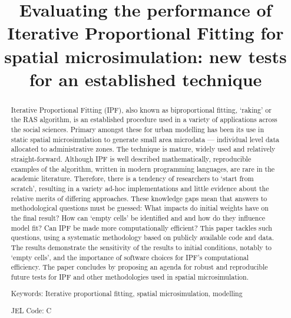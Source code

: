 \documentclass[a4paper,10pt]{article}
\title{Evaluating the performance of Iterative Proportional Fitting for spatial microsimulation: new tests for an established technique}
\begin{document}
\maketitle

\begin{abstract}
Iterative Proportional Fitting (IPF), also known as biproportional
fitting, `raking' or the RAS algorithm,
is an established procedure used in a variety of applications
across the social sciences. Primary amongst these for urban modelling has been its use in
static spatial microsimulation to generate small area microdata --- individual
level data allocated to administrative zones.
The technique is mature, widely used and relatively straight-forward.
Although IPF is well described mathematically, reproducible examples of the
algorithm, written in modern programming languages, are rare in the academic
literature. Therefore, there is  a tendency of researchers to `start from
scratch', resulting in a variety ad-hoc implementations and little evidence about the relative merits of differing approaches.
These knowledge gaps mean that answers to methodological questions must be guessed:
What impacts do initial weights have on the final result?
How can `empty cells' be identified and
and how do they influence model fit? Can IPF
be made more computationally efficient?
This paper tackles such questions, using a systematic methodology 
based on publicly available code and data.
The results demonstrate the sensitivity of the results to
initial conditions, notably to `empty cells', and the
importance of software choices for IPF's computational efficiency.
The paper concludes by proposing an agenda for robust and reproducible future tests
for IPF and other methodologies used in spatial microsimulation.

Keywords: Iterative proportional fitting, spatial microsimulation, modelling

JEL Code: C
\end{abstract}
\end{document}
